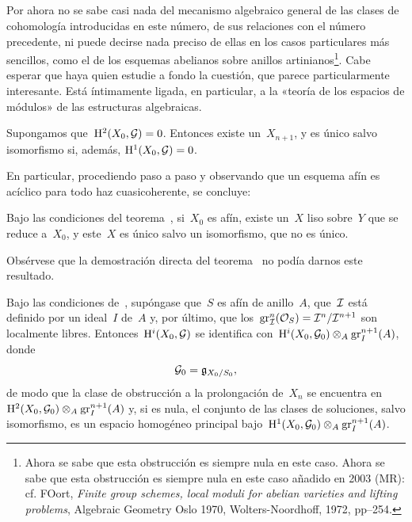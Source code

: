 \setcounter{subsection}{5}%
\subsection{}
\label{III.6.6}
Por ahora no se sabe casi nada del mecanismo algebraico general de las clases de cohomología introducidas en este número, de sus relaciones con el número precedente, ni puede decirse nada preciso de ellas en los casos particulares más sencillos, como el de los esquemas abelianos sobre anillos artinianos\footnote{\label{III.6.6.p24}%
{Ahora se sabe que esta obstrucción es siempre nula en este caso.}
{Ahora se sabe que esta obstrucción es siempre nula en este caso \lcrochetbf añadido en 2003 (MR): cf. F\ptbl Oort, \emph{Finite group schemes, local moduli for abelian varieties and lifting problems}, Algebraic Geometry Oslo 1970, Wolters-Noordhoff, 1972, pp--254\rcrochetbf.}}. Cabe esperar que haya quien estudie a fondo la cuestión, que parece particularmente interesante. Está íntimamente ligada, en particular, a la «teoría de los espacios de módulos» de las estructuras algebraicas.

\begin{corollaire}
\label{III.6.7}
Supongamos que~$\H^2(X_0,\cal{G})=0$. Entonces existe un~$X_{n+1}$, y es único salvo isomorfismo si, además, $\H^1(X_0,\cal{G})=0$.
\end{corollaire}

En particular, procediendo paso a paso y observando que un esquema afín es acíclico para todo haz cuasicoherente, se concluye:

\begin{corollaire}
\label{III.6.8}
Bajo
las condiciones del teorema~, si~$X_0$ es afín, existe un~$X$ liso sobre~$Y$ que se reduce a~$X_0$, y este~$X$ es único salvo un isomorfismo, que no es único.
\end{corollaire}

Obsérvese que la demostración directa del teorema~ no podía darnos este resultado.

\begin{corollaire}
\label{III.6.9}
Bajo las condiciones de~, supóngase que~$S$ es afín de anillo~$A$, que~$\cal{I}$ está definido por un ideal~$I$ de~$A$ y, por último, que los~$\gr^n_{\cal{I}}(\cal{O}_S)=\cal{I}^n/\cal{I}^{n+1}$ son localmente libres. Entonces~$\H^i(X_0,\cal{G})$ se identifica con~$\H^i(X_0,\cal{G}_0)\otimes_A\gr_I^{n+1}(A)$, donde
$$
\cal{G}_0=\goth{g}_{X_0/S_0},
$$
de modo que la clase de obstrucción a la prolongación de~$X_n$ se encuentra en~$\H^2(X_0,\cal{G}_0)\otimes_A\gr_I^{n+1}(A)$ y, si es nula, el conjunto de las clases de soluciones, salvo isomorfismo, es un espacio homogéneo principal bajo~$\H^1(X_0,\cal{G}_0)\otimes_A\gr_I^{n+1}(A)$.
\end{corollaire}

